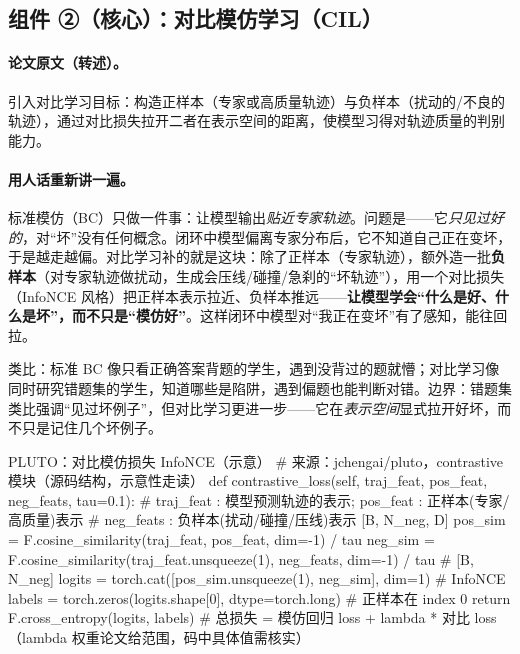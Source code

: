\subsection{组件 ②（核心）：对比模仿学习（CIL）}
\label{sec:de-cil}

\paragraph{论文原文（转述）。}
引入对比学习目标：构造正样本（专家或高质量轨迹）与负样本（扰动的/不良的轨迹），通过对比损失拉开二者在表示空间的距离，使模型习得对轨迹质量的判别能力\cite{cheng2024pluto}。

\paragraph{用人话重新讲一遍。}
标准模仿（BC）只做一件事：让模型输出\emph{贴近专家轨迹}。问题是——它\emph{只见过好的}，对“坏”没有任何概念。闭环中模型偏离专家分布后，它不知道自己正在变坏，于是越走越偏。对比学习补的就是这块：除了正样本（专家轨迹），额外造一批\textbf{负样本}（对专家轨迹做扰动，生成会压线/碰撞/急刹的“坏轨迹”），用一个对比损失（InfoNCE 风格）把正样本表示拉近、负样本推远——\textbf{让模型学会“什么是好、什么是坏”，而不只是“模仿好”}。这样闭环中模型对“我正在变坏”有了感知，能往回拉。

类比：标准 BC 像只看正确答案背题的学生，遇到没背过的题就懵；对比学习像同时研究错题集的学生，知道哪些是陷阱，遇到偏题也能判断对错。边界：错题集类比强调“见过坏例子”，但对比学习更进一步——它在\emph{表示空间}显式拉开好坏，而不只是记住几个坏例子。

\begin{codebox}[Python]{PLUTO：对比模仿损失 InfoNCE（示意）}
# 来源：jchengai/pluto，contrastive 模块（源码结构，示意性走读）
def contrastive_loss(self, traj_feat, pos_feat, neg_feats, tau=0.1):
    # traj_feat : 模型预测轨迹的表示; pos_feat : 正样本(专家/高质量)表示
    # neg_feats : 负样本(扰动/碰撞/压线)表示 [B, N_neg, D]
    pos_sim = F.cosine_similarity(traj_feat, pos_feat, dim=-1) / tau
    neg_sim = F.cosine_similarity(traj_feat.unsqueeze(1), neg_feats, dim=-1) / tau  # [B, N_neg]
    logits = torch.cat([pos_sim.unsqueeze(1), neg_sim], dim=1)   # InfoNCE
    labels = torch.zeros(logits.shape[0], dtype=torch.long)      # 正样本在 index 0
    return F.cross_entropy(logits, labels)
# 总损失 = 模仿回归 loss + lambda * 对比 loss（lambda 权重论文给范围，码中具体值需核实）
\end{codebox}


